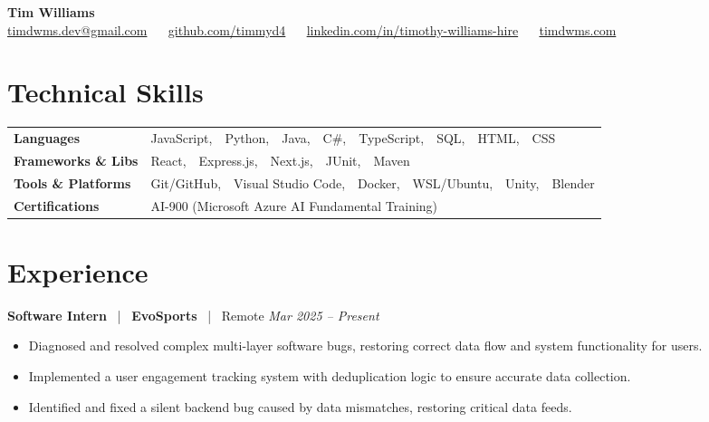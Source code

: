 \documentclass[10pt, letterpaper]{article}
\newcommand{\jobhead}[4]{%
  \vspace{5pt}%
  {\bfseries\color{dark}#1}%
  ~{\color{light}|}~%
  {\bfseries\color{navy}#2}%
  ~{\color{light}|}~%
  {\color{light}#3}%
  \hfill{\color{light}\small\textit{#4}}\\[-2pt]%
}
\newcommand{\skillrow}[2]{%
  {\bfseries #1} & #2 \\[2pt]%
}
\begin{document}

\begin{center}
  {\huge\bfseries\color{navy} Tim Williams}\\[4pt]
  {\small\color{light}
    \href{mailto:timdwms.dev@gmail.com}{timdwms.dev@gmail.com}
    ~\textbullet~
    \href{https://github.com/timmyd4}{github.com/timmyd4}
    ~\textbullet~
    \href{https://www.linkedin.com/in/timothy-williams-hire}{linkedin.com/in/timothy-williams-hire}
    ~\textbullet~
    \href{https://timdwms.com}{timdwms.com}
  }
\end{center}

\vspace{2pt}

\section{Technical Skills}

\begin{tabular}{@{}p{1.6in} p{5.2in}@{}}
  \skillrow{Languages}{JavaScript,\ \ Python,\ \ Java,\ \ C\#,\ \ TypeScript,\ \ SQL,\ \ HTML,\ \ CSS}
  \skillrow{Frameworks \& Libs}{React,\ \ Express.js,\ \ Next.js,\ \ JUnit,\ \ Maven}
  \skillrow{Tools \& Platforms}{Git/GitHub,\ \ Visual Studio Code,\ \ Docker,\ \ WSL/Ubuntu,\ \ Unity,\ \ Blender}
  \skillrow{Certifications}{AI-900 (Microsoft Azure AI Fundamental Training)}
\end{tabular}

\section{Experience}

\jobhead{Software Intern}{EvoSports}{Remote}{Mar 2025 – Present}
\begin{itemize}
  \item Diagnosed and resolved complex multi-layer software bugs, restoring correct data flow and system functionality for users.
  \item Implemented a user engagement tracking system with deduplication logic to ensure accurate data collection.
  \item Identified and fixed a silent backend bug caused by data mismatches, restoring critical data feeds.
\end{itemize}
\end{document}
